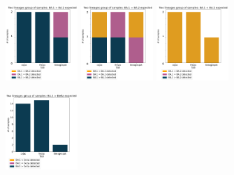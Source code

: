                 \begin{figure}[H]
                    \begin{subfigure}{\linewidth}
                	\centering
                    \includegraphics[width=0.3\textwidth]{figures/results/mock/ba1Gba2-bars.png}\hfill
                    \includegraphics[width=0.3\textwidth]{figures/results/mock/ba1EQba2-bars.png}\hfill
                    \includegraphics[width=0.3\textwidth]{figures/results/mock/ba1Lba2-bars.png}
                    \label{fig:results:mock:ba1-ba2}
                    \end{subfigure}\par\medskip
                    \begin{subfigure}{\linewidth}
                	\centering
                    \includegraphics[width=0.3\textwidth]{figures/results/mock/ba1Gd-bars.png}\hfill

\end{subfigure}
\end{figure}
